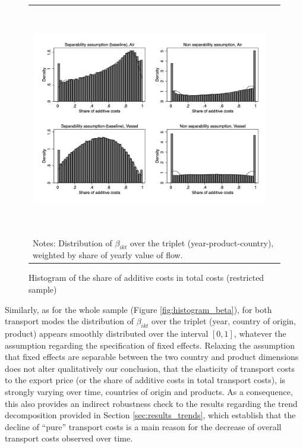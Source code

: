 \documentclass[a4paper,11pt]{article}
\begin{document}
\begin{figure}[htbp]
\caption{Histogram of the share of additive costs in total costs (restricted sample)}
\label{fig:histogram_beta_robustness}
\begin{center}
\begin{tabular}{cc}
\includegraphics[width=14cm, height=10cm]{Etude_beta_pond.jpg}\\
\multicolumn{2}{l}{{\footnotesize Notes: Distribution of $\beta_{ikt}$ over the triplet (year-product-country), weighted by share of yearly value of flow.}}\\
\end{tabular}
\end{center}
\end{figure}

Similarly, as for the whole sample (Figure \ref{fig:histogram_beta}), for both transport modes the distribution of $\beta_{ikt}$ over the triplet (year, country of origin, product) appears smoothly distributed over the interval $[0,1]$, whatever the assumption regarding the specification of fixed effects.
Relaxing the assumption that fixed effects are separable between the two country and product dimensions does not alter qualitatively our conclusion, that the elasticity of transport costs to the export price (or the share of additive costs in total transport costs), is strongly varying over time, countries of origin and products.
As a consequence, this also provides an indirect robustness check to the results regarding the trend decomposition provided in Section \ref{sec:results_trends}, which establish that the decline of ``pure'' transport costs is a main reason for the decrease of overall transport costs observed over time.
\end{document}
